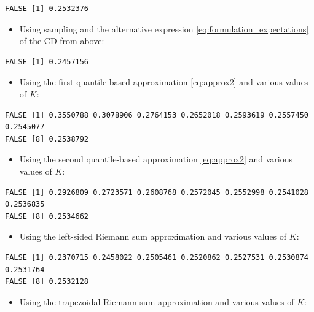 \documentclass[
]{article}
\providecommand{\tightlist}{%
  \setlength{\itemsep}{0pt}\setlength{\parskip}{0pt}}
\begin{document}
\begin{verbatim}
FALSE [1] 0.2532376
\end{verbatim}

\begin{itemize}
\tightlist
\item
  Using sampling and the alternative expression
  \eqref{eq:formulation_expectations} of the CD from above:
\end{itemize}

\begin{verbatim}
FALSE [1] 0.2457156
\end{verbatim}

\begin{itemize}
\tightlist
\item
  Using the first quantile-based approximation \eqref{eq:approx2} and
  various values of \(K\):
\end{itemize}

\begin{verbatim}
FALSE [1] 0.3550788 0.3078906 0.2764153 0.2652018 0.2593619 0.2557450 0.2545077
FALSE [8] 0.2538792
\end{verbatim}

\begin{itemize}
\tightlist
\item
  Using the second quantile-based approximation \eqref{eq:approx2} and
  various values of \(K\):
\end{itemize}

\begin{verbatim}
FALSE [1] 0.2926809 0.2723571 0.2608768 0.2572045 0.2552998 0.2541028 0.2536835
FALSE [8] 0.2534662
\end{verbatim}

\begin{itemize}
\tightlist
\item
  Using the left-sided Riemann sum approximation and various values of
  \(K\):
\end{itemize}

\begin{verbatim}
FALSE [1] 0.2370715 0.2458022 0.2505461 0.2520862 0.2527531 0.2530874 0.2531764
FALSE [8] 0.2532128
\end{verbatim}

\begin{itemize}
\tightlist
\item
  Using the trapezoidal Riemann sum approximation and various values of
  \(K\):
\end{itemize}
\end{document}
